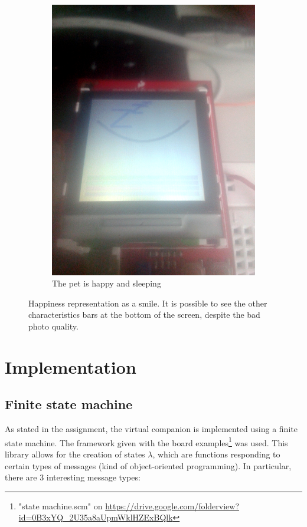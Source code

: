 \documentclass[a4paper]{article}
\begin{document}
\begin{figure}[h]
\begin{subfigure}[b]{0.3\textwidth}
    \includegraphics[width=\textwidth]{Pictures/sleeping.png}
    \caption{\label{fig:smile:sleeping} The pet is happy and sleeping}
  \end{subfigure}
  \caption{\label{fig:smile} Happiness representation as a smile. It is possible to see the other characteristics bars at the bottom of the screen, despite the bad photo quality.}
\end{figure}

\section{Implementation}
\subsection{Finite state machine}
As stated in the assignment, the virtual companion is implemented using a finite state machine. The framework given with the board examples\footnote{"state machine.scm" on \url{https://drive.google.com/folderview?id=0B3xYQ_2U35a8aUpmWklHZExBQlk}} was used. This library allows for the creation of states $\lambda$, which are functions responding to certain types of messages (kind of object-oriented programming). In particular, there are 3 interesting message types:
\end{document}
